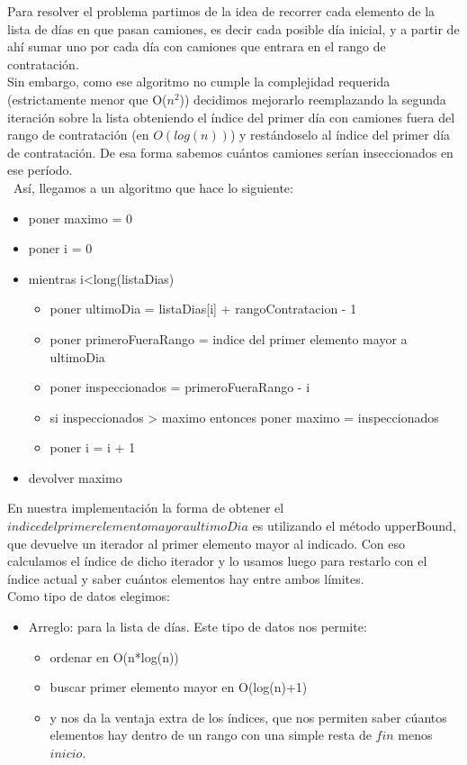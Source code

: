 Para resolver el problema partimos de la idea de recorrer cada elemento de la lista de d\'ias en que pasan camiones, es decir cada posible d\'ia inicial, y a partir de ah\'i sumar uno por cada d\'ia con camiones que entrara en el rango de contrataci\'on.\\
Sin embargo, como ese algoritmo no cumple la complejidad requerida (estrictamente menor que O($n^2$)) decidimos mejorarlo reemplazando la segunda iteraci\'on sobre la lista obteniendo el \'indice del primer d\'ia con camiones fuera del rango de contrataci\'on (en $O(log(n))$) y rest\'andoselo al \'indice del primer d\'ia de contrataci\'on. De esa forma sabemos cu\'antos camiones ser\'ian inseccionados en ese per\'iodo.\\\
As\'i, llegamos a un algoritmo que hace lo siguiente:
\begin{itemize}
\item poner maximo = 0
\item poner i = 0
\item mientras i<long(listaDias)
\begin{itemize}
	\item poner ultimoDia = listaDias[i] + rangoContratacion - 1
	\item poner primeroFueraRango = indice del primer elemento mayor a ultimoDia
	\item poner inspeccionados = primeroFueraRango - i
	\item si inspeccionados > maximo entonces poner maximo = inspeccionados
	\item poner i = i + 1
\end{itemize}
\item devolver maximo
\end{itemize}

En nuestra implementaci\'on la forma de obtener el $indice del primer elemento mayor a ultimoDia$ es utilizando el m\'etodo upperBound, que devuelve un iterador al primer elemento mayor al indicado. Con eso calculamos el \'indice de dicho iterador y lo usamos luego para restarlo con el \'indice actual y saber cu\'antos elementos hay entre ambos l\'imites.\\

Como tipo de datos elegimos:
\begin{itemize}
\item Arreglo: para la lista de d\'ias. Este tipo de datos nos permite: 
\begin{itemize}
 \item ordenar en O(n*log(n))
 \item buscar primer elemento mayor en O(log(n)+1)
 \item y nos da la ventaja extra de los \'indices, que nos permiten saber c\'uantos elementos hay dentro de un rango con una simple resta de $fin$ menos $inicio$.
\end{itemize}
\end{itemize}


